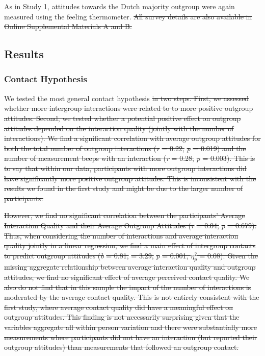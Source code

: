 \documentclass[man, 12pt, a4paper, mask]{apa7} %
\theoremstyle{break}
\theoremstyle{plain}
\providecommand{\DIFdeltex}[1]{{\protect\color{red}\sout{#1}}}                      %
\providecommand{\DIFdelbegin}{} %
\providecommand{\DIFdelend}{} %
\providecommand{\DIFdel}[1]{\texorpdfstring{\DIFdeltex{#1}}{}} %
\newcommand{\DIFscaledelfig}{0.5}
\newlength{\DIFdelgraphicswidth} %
\newlength{\DIFdelgraphicsheight} %
\newcommand{\DIFdelincludegraphics}[2][]{%
\sbox{\DIFdelgraphicsbox}{\DIFOincludegraphics[#1]{#2}}%
\settoboxwidth{\DIFdelgraphicswidth}{\DIFdelgraphicsbox} %
\settoboxtotalheight{\DIFdelgraphicsheight}{\DIFdelgraphicsbox} %
\scalebox{\DIFscaledelfig}{%
\parbox[b]{\DIFdelgraphicswidth}{\usebox{\DIFdelgraphicsbox}\\[-\baselineskip] \rule{\DIFdelgraphicswidth}{0em}}\llap{\resizebox{\DIFdelgraphicswidth}{\DIFdelgraphicsheight}{%
\setlength{\unitlength}{\DIFdelgraphicswidth}%
\begin{picture}(1,1)%
\thicklines\linethickness{2pt} %
{\color[rgb]{1,0,0}\put(0,0){\framebox(1,1){}}}%
{\color[rgb]{1,0,0}\put(0,0){\line( 1,1){1}}}%
{\color[rgb]{1,0,0}\put(0,1){\line(1,-1){1}}}%
\end{picture}%
}\hspace*{3pt}}} %
} %
\DeclareRobustCommand{\DIFdelbegin}{\DIFOdelbegin \let\includegraphics\DIFdelincludegraphics} %
\DeclareRobustCommand{\DIFdelend}{\DIFOaddend \let\includegraphics\DIFOincludegraphics} %
\begin{document}
As in Study 1, attitudes towards the Dutch majority outgroup were again
measured using the feeling thermometer.
\DIFdelbegin \DIFdel{All survey details are also
available in Online Supplemental Materials A and B.
}\DIFdelend 

\subsection{Results}

\subsubsection{Contact Hypothesis}

We tested the most general contact hypothesis \DIFdelbegin \DIFdel{in two steps. First, we assessed whether more intergroup interactions were related to to more
positive outgroup attitudes. Second, we tested whether a potential
positive effect on outgroup attitudes depended on the interaction
quality (jointly with the number of interactions). We find a significant
correlation with average outgroup attitudes for both the total number of
outgroup interactions (}\textit{\DIFdel{r}} %
\DIFdel{= 0.22, }\textit{\DIFdel{p}} %
\DIFdel{= 0.019) and the
number of measurement beeps with an interaction (}\textit{\DIFdel{r}} %
\DIFdel{= 0.28,
}\textit{\DIFdel{p}} %
\DIFdel{= 0.003). This is to say that within our data, participants
with more outgroup interactions did have significantly more positive
outgroup attitudes. This is inconsistent with the results we found in
the first study and might be due to the larger number of participants.
}%

\DIFdel{However, we find no significant correlation between the participants'
Average Interaction Quality and their Average Outgroup Attitudes
(}\textit{\DIFdel{r}} %
\DIFdel{= 0.04, }\textit{\DIFdel{p}} %
\DIFdel{= 0.679). Thus, when considering the
number of interactions and average interaction quality jointly in a
linear regression, we find a main effect of intergroup contacts to
predict outgroup attitudes (}\textit{\DIFdel{b}} %
\DIFdel{= 0.81, }%
\DIFdel{= 3.29,
}\textit{\DIFdel{p}} %
\DIFdel{= 0.001, \(\eta_p^2\) = 0.08). Given the missing aggregate
relationship between average interaction quality and outgroup attitudes,
we find no significant effect of average perceived contact quality. We
also do not find that in this sample the impact of the number of
interactions is moderated by the average contact quality. This is not
entirely consistent with the first study, where average contact quality
did have a meaningful effect on outgroup attitudes. This finding is not
necessarily surprising given that the variables aggregate all within
person variation and there were substantially more measurements where
participants did not have an interaction (but reported their outgroup
attitudes) than measurements that followed an outgroup contact.
}%
\end{document}
